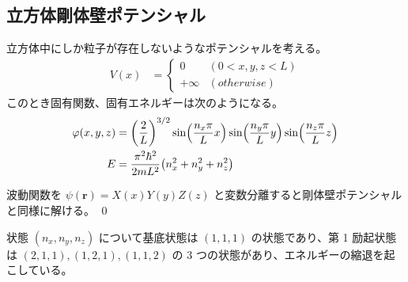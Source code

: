 \documentclass[uplatex,dvipdfmx,a4paper,11pt]{jlreq}
\makeatletter
\newcommand{\rr}{\bm{r}}
\theoremstyle{definition}
\renewenvironment{proof}[1][\proofname]{\par
  \normalfont
  \topsep6\p@\@plus6\p@ \trivlist
  \item[\hskip\labelsep{\bfseries #1}\@addpunct{\bfseries}]\ignorespaces\quad\par
}{%
  \qed\endtrivlist\@endpefalse
}
\renewcommand\proofname{証明}
\makeatother
\begin{document}
\subsection{立方体剛体壁ポテンシャル}
\begin{proposition}
  立方体中にしか粒子が存在しないようなポテンシャルを考える。
  \begin{align}
    V(x) & = \begin{cases}
               0        & (0 < x, y, z < L) \\
               + \infty & (otherwise)
             \end{cases}
  \end{align}
  このとき固有関数、固有エネルギーは次のようになる。
  \begin{align}
    \varphi(x, y, z) & = \qty(\frac{2}{L})^{3/2}\sin(\frac{n_x\pi}{L}x)\sin(\frac{n_y\pi}{L}y)\sin(\frac{n_z\pi}{L}z) \\
    E                & = \frac{\pi^2\hbar^2}{2mL^2}\qty(n_x^2 + n_y^2 + n_z^2)
  \end{align}
\end{proposition}
\begin{proof}
  波動関数を $\psi(\rr) = X(x)Y(y)Z(z)$ と変数分離すると剛体壁ポテンシャルと同様に解ける。
\end{proof}

状態 $(n_x, n_y, n_z)$ について基底状態は $(1, 1, 1)$ の状態であり、第 1 励起状態は $(2, 1, 1), (1, 2, 1), (1, 1, 2)$ の 3 つの状態があり、エネルギーの縮退を起こしている。
\end{document}
